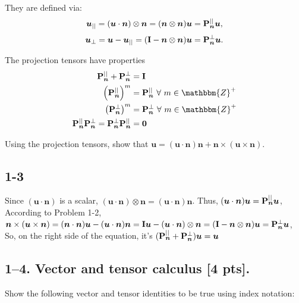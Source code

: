 They are defined via:
\begin{equation*}
    \bm{u}_{||} = (\bm{u} \cdot \bm{n}) \otimes \bm{n} = (\bm{n} \otimes \bm{n}) \bm{u} = \mathbf{P}_{\bm{n}}^{||} \bm{u},
\end{equation*}
\begin{equation*}
    \bm{u}_{\perp} = \bm{u} - \bm{u}_{||} = (\mathbf{I} - \bm{n} \otimes \bm{n}) \bm{u} = \mathbf{P}_{\bm{n}}^{\perp} \bm{u}.
\end{equation*}

The projection tensors have properties
\begin{align*}
    \bn{P}_{\bm{n}}^{||} + \bn{P}_{\bm{n}}^{\perp} &= \bn{I} \\
    \left(\bn{P}_{\bm{n}}^{||} \right)^m &= \bn{P}_{\bm{n}}^{||} ~\forall ~m \in \mathbbm{Z}^+\\
    \left(\bn{P}_{\bm{n}}^{\perp} \right)^m &= \bn{P}_{\bm{n}}^{\perp} ~\forall ~m \in \mathbbm{Z}^+\\
    \bn{P}_{\bm{n}}^{||} \bn{P}_{\bm{n}}^{\perp} = \bn{P}_{\bm{n}}^{\perp} \bn{P}_{\bm{n}}^{||}  &= \bn{0}
\end{align*}

Using the projection tensors, show that $\bm{u} = (\bm{u} \cdot \bm{n}) \bm{n} + \bm{n} \times (\bm{u} \times \bm{n} )$.
\subsection*{1-3}

Since $(\bm{u} \cdot \bm{n})$ is a scalar, $(\bm{u} \cdot \bm{n})\otimes\bm{n} = (\bm{u} \cdot \bm{n})\bm{n}$. Thus, $(\bm{u} \cdot \bm{n})\bm{u} = \mathbf{P}_{\bm{n}}^{||} \bm{u}$, \\
According to Problem 1-2, $ \bm{n} \times (\bm{u} \times \bm{n} ) = (\bm{n}\cdot \bm{n})\bm{u}-(\bm{u}\cdot\bm{n})\bm{n} = \mathbf{I}\bm{u}-(\bm{u} \cdot \bm{n})\otimes\bm{n}=(\mathbf{I} - \bm{n} \otimes \bm{n}) \bm{u} = \mathbf{P}_{\bm{n}}^{\perp} \bm{u} $, \\
So, on the right side of the equation, it's $(\mathbf{P}_{\bm{n}}^{||}+\mathbf{P}_{\bm{n}}^{\perp})\bm{u} = \bm{u}$

\bigskip
\subsection*{1--4. \textbf{Vector and tensor calculus} [4 pts].} Show the following vector and tensor identities to be true using index notation:

